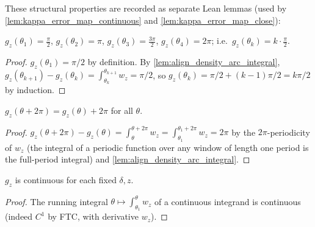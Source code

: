 These structural properties are recorded as separate Lean lemmas (used by
\cref{lem:kappa_error_map_continuous} and \cref{lem:kappa_error_map_close}):

\begin{lemma}

  \label{lem:align_reparam_node_values}
  $g_z(\theta_1)=\tfrac\pi2$, $g_z(\theta_2)=\pi$, $g_z(\theta_3)=\tfrac{3\pi}2$,
  $g_z(\theta_4)=2\pi$; i.e.\ $g_z(\theta_k)=k\cdot\tfrac\pi2$.
\end{lemma}
\begin{proof}
  \leanok
  $g_z(\theta_1)=\pi/2$ by definition. By
  \cref{lem:align_density_arc_integral}, $g_z(\theta_{k+1})-g_z(\theta_k)=
  \int_{\theta_k}^{\theta_{k+1}}w_z=\pi/2$, so $g_z(\theta_k)=\pi/2+(k-1)\pi/2=k\pi/2$
  by induction.
\end{proof}

\begin{lemma}

  \label{lem:align_reparam_add_two_pi}
  $g_z(\theta+2\pi)=g_z(\theta)+2\pi$ for all $\theta$.
\end{lemma}
\begin{proof}
  \leanok
  $g_z(\theta+2\pi)-g_z(\theta)=\int_{\theta}^{\theta+2\pi}w_z=
  \int_{\theta_1}^{\theta_1+2\pi}w_z=2\pi$ by the $2\pi$-periodicity of $w_z$ (the
  integral of a periodic function over any window of length one period is the
  full-period integral) and \cref{lem:align_density_arc_integral}.
\end{proof}

\begin{lemma}

  \label{lem:continuous_align_reparam}
  $g_z$ is continuous for each fixed $\delta,z$.
\end{lemma}
\begin{proof}
  \leanok
  The running integral $\theta\mapsto\int_{\theta_1}^{\theta}w_z$ of a continuous
  integrand is continuous (indeed $C^1$ by FTC, with derivative $w_z$).
\end{proof}

